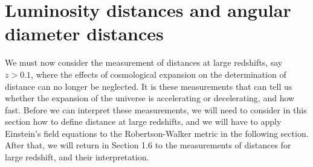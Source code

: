 \documentclass[11pt,a4paper,dvipdfmx]{jsarticle}
\theoremstyle{plain}
\theoremstyle{break}
\begin{document}
\section{Luminosity distances and angular diameter distances}
We must now consider the measurement of distances at large redshifts, say $z > 0.1$,
where the effects of cosmological expansion on the determination of distance can no longer be neglected.
It is these measurements that can tell us whether the expansion of the universe is accelerating or decelerating, and how fast.
Before we can interpret these measurements, we will need to consider in this section how to define distance at large redshifts, and we will have to apply Einstein's field equations to the Robertson-Walker metric in the following section.
After that, we will return in Section 1.6 to the measurements of distances for large redshift, and their interpretation.
\end{document}
